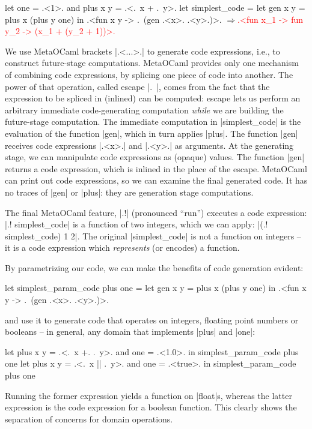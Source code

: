 \documentclass{elsart}
\newcommand{\evalresult}[1]{\ensuremath{\Longrightarrow}\textcolor{red}{#1}}
\begin{document}
\begin{code}[commandchars=\\\{\}]
let one = .<1>. and plus x y = .<.~x + .~y>.
let simplest_code = let gen x y = plus x (plus y one) in
  .<fun x y -> .~(gen .<x>. .<y>.)>.
\evalresult{.<fun x_1 -> fun y_2 -> (x_1 + (y_2 + 1))>.}
\end{code}

We use MetaOCaml brackets |.<...>.| to generate code expressions,
i.e., to construct future-stage computations. MetaOCaml provides only
one mechanism of combining code expressions, by splicing one
piece of code into
another. The power of that operation, called escape |.~|, comes from
the fact that the expression to be spliced in (inlined) can be
computed: escape lets us perform an arbitrary immediate code-generating
computation \emph{while} we are
building the future-stage computation. The immediate computation in
|simplest_code| is the evaluation of the function |gen|, which in turn
applies |plus|. The function |gen| receives code expressions |.<x>.|
and |.<y>.| as arguments. At the generating stage, we can manipulate
code expressions as (opaque) values. The function |gen| returns a code
expression, which is inlined in the place of the escape. MetaOCaml can
print out code expressions, so we can examine the final generated code. It
has no traces of |gen| or |plus|: they are generation stage computations.

The final MetaOCaml feature, |.!| (pronounced ``run'') 
executes a code expression: |.! simplest_code| is a function of two
integers, which we can apply: |(.! simplest_code) 1 2|. The original
|simplest_code| is not a function on integers -- it is a code
expression which \emph{represents} (or encodes) a function.

By parametrizing our code, we can make the benefits of code generation
evident:

\begin{code}
let simplest_param_code plus one =
  let gen x y = plus x (plus y one) in
  .<fun x y -> .~(gen .<x>. .<y>.)>.
\end{code}
and use it to generate code that operates on integers, floating point
numbers or booleans -- in general, any domain that implements |plus|
and |one|:
\begin{code}
let plus x y = .<.~x +. .~y>. and one = .<1.0>. in
  simplest_param_code plus one
let plus x y = .<.~x || .~y>. and one = .<true>. in
  simplest_param_code plus one
\end{code}
Running the former expression yields a function on |float|s, whereas
the latter expression is the code expression for a boolean function.
This clearly shows the separation of concerns for domain
operations.
\end{document}
